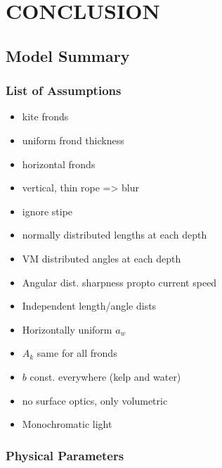 \chapter{CONCLUSION}
\label{chap:conclusion}


\section{Model Summary}
\subsection{List of Assumptions}
\begin{itemize}
  \item kite fronds
  \item uniform frond thickness
  \item horizontal fronds
  \item vertical, thin rope => blur
  \item ignore stipe
  \item normally distributed lengths at each depth
  \item VM distributed angles at each depth
  \item Angular dist. sharpness propto current speed
  \item Independent length/angle dists
  \item Horizontally uniform $a_w$
  \item $A_k$ same for all fronds
  \item $b$ const. everywhere (kelp and water)
  \item no surface optics, only volumetric
  \item Monochromatic light
\end{itemize}

\subsection{Physical Parameters}

